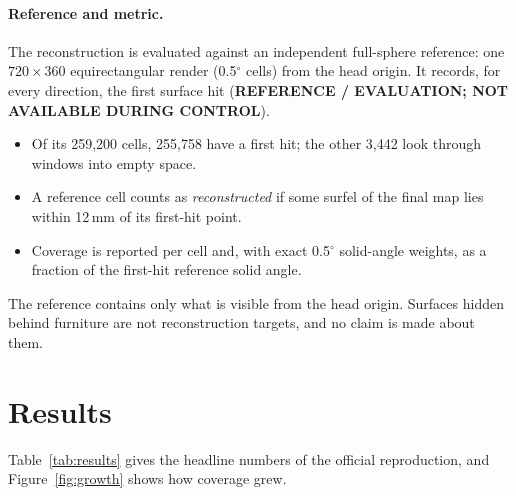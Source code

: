 \documentclass[11pt,a4paper]{article}
\newcommand{\truth}[1]{{\sffamily\footnotesize\textbf{#1}}}
\newcommand{\degr}{\ensuremath{^\circ}}
\begin{document}
\paragraph{Reference and metric.} The reconstruction is evaluated against an independent full-sphere reference: one
$720\times360$ equirectangular render (0.5\degr{} cells) from the head origin. It records, for every direction, the
first surface hit (\truth{REFERENCE / EVALUATION; NOT AVAILABLE DURING CONTROL}).
\begin{itemize}
  \item Of its 259{,}200 cells, 255{,}758 have a first hit; the other 3{,}442 look through windows into empty space.
  \item A reference cell counts as \emph{reconstructed} if some surfel of the final map lies within 12\,mm of its
        first-hit point.
  \item Coverage is reported per cell and, with exact 0.5\degr{} solid-angle weights, as a fraction of the first-hit
        reference solid angle.
\end{itemize}
The reference contains only what is visible from the head origin. Surfaces hidden behind furniture are not
reconstruction targets, and no claim is made about them.

\section{Results}\label{sec:results}

Table~\ref{tab:results} gives the headline numbers of the official reproduction, and Figure~\ref{fig:growth} shows how
coverage grew.
\end{document}
